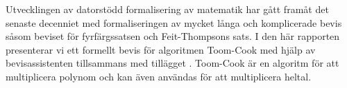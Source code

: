 Utvecklingen av datorstödd formalisering av matematik har gått framåt det
senaste decenniet med formaliseringen av mycket långa och komplicerade bevis
såsom beviset för fyrfärgssatsen och Feit-Thompsons sats. I den här rapporten
presenterar vi ett formellt bevis för algoritmen Toom-Cook med hjälp av
bevisassistenten \coq{} tillsammans med tillägget \ssr{}. Toom-Cook är en algoritm
för att multiplicera polynom och kan även användas för att multiplicera heltal.

